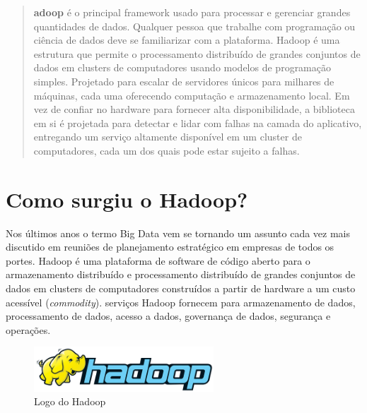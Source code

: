 \documentclass[a4paper,11pt]{article}
\begin{document}
	
\maketitle %
\thispagestyle{fancy} %


\begin{abstract}	
	\textbf{adoop\cite{hadoopoficial}} é o principal framework usado para processar e gerenciar grandes quantidades de dados. Qualquer pessoa que trabalhe com programação ou ciência de dados deve se familiarizar com a plataforma. Hadoop é uma estrutura que permite o processamento distribuído de grandes conjuntos de dados em clusters de computadores usando modelos de programação simples. Projetado para escalar de servidores únicos para milhares de máquinas, cada uma oferecendo computação e armazenamento local. Em vez de confiar no hardware para fornecer alta disponibilidade, a biblioteca em si é projetada para detectar e lidar com falhas na camada do aplicativo, entregando um serviço altamente disponível em um cluster de computadores, cada um dos quais pode estar sujeito a falhas.
\end{abstract}

\section{Como surgiu o Hadoop?}
Nos últimos anos o termo Big Data vem se tornando um assunto cada vez mais discutido em reuniões de planejamento estratégico em empresas de todos os portes. Hadoop é uma plataforma de software de código aberto para o armazenamento distribuído e processamento distribuído de grandes conjuntos de dados em clusters de computadores construídos a partir de hardware a um custo acessível (\textit{commodity}). serviços Hadoop fornecem para armazenamento de dados, processamento de dados, acesso a dados, governança de dados, segurança e operações.
\begin{figure}[H]
	\centering
	\includegraphics[width=0.6\textwidth]{imgHadoop/logo.png}
	\caption{Logo do Hadoop}
\end{figure}
\end{document}
